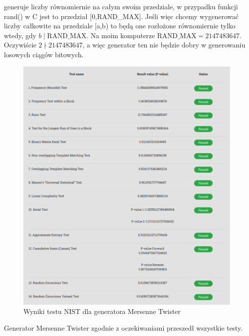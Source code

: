 \documentclass{report}
\begin{document}
generuje liczby równomiernie na całym swoim przedziale, w przypadku funkcji
rand() w C jest to przedział [0,\textrm{RAND\_MAX}]. Jeśli więc chcemy wygenerować
liczby całkowite na przedziale [a,b) to będą one rozłożone równomiernie tylko wtedy,
gdy \(b\mid\textrm{RAND\_MAX}\). Na moim komputerze \(\textrm{RAND\_MAX} = 2147483647\).
Oczywiście \(2 \nmid 2147483647\), a więc generator ten nie będzie dobry w generowaniu
losowych ciągów bitowych.
\begin{figure}[H]
    \centering
    \includegraphics[scale=0.5]{../lepszy_generator.png}
    \caption[Example .]{Wyniki testu NIST dla generatora Mersenne Twister}
    \label{plotB}
\end{figure}
Generator Mersenne Twister zgodnie z oczekiwaniami przeszedł wszystkie testy.
\end{document}
